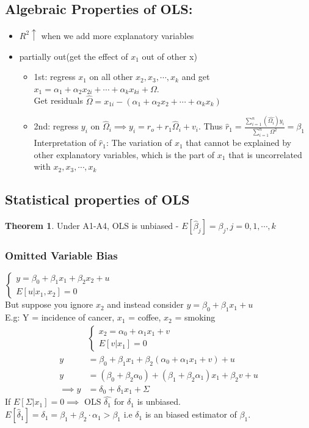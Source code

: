 \documentclass{article}
\theoremstyle{definition}
\theoremstyle{thrm}
\newtheorem{thrm}{Theorem}[section]
\theoremstyle{lma}
\theoremstyle{ppst}
\theoremstyle{crlr}
\begin{document}
\subsection{Algebraic Properties of OLS: }
\begin{itemize}
	\item $R^2\uparrow$ when we add more explanatory variables
	\item partially out(get the effect of $x_1$ out of other x)\begin{itemize}
		\item 1st: regress $x_1$ on all other $x_2, x_3,\cdots,x_k$ and get $x_1 = \alpha_1+\alpha_2x_{2i}+\cdots+\alpha_kx_{ki}+\Omega$.\\ Get residuals $\hat{\Omega} = x_{1i}-(\alpha_1+\alpha_2x_2+\cdots+\alpha_kx_k)$
		\item 2nd: regress $y_i$ on $\hat{\Omega}_i\implies y_i = r_o+r_1\hat{\Omega}_i+v_i$. Thus $\hat{r}_1 = \frac{\sum_{i=1}^n(\hat{\Omega_i})y_i}{\sum_{i=1}^n\Omega^2} = \hat{\beta_1}$\\Interpretation of $\hat{r}_1$: The variation of $x_1$ that cannot be explained by other explanatory variables, which is the part of $x_1$ that is uncorrelated with $x_2,x_3,\cdots,x_k$
	\end{itemize}
\end{itemize}

\subsection{Statistical properties of OLS}
\begin{thrm}
	Under A1-A4, OLS is unbiased - $E[\hat{\beta}_j] = \beta_j, j=0,1,\cdots,k$
\end{thrm}
\subsubsection{Omitted Variable Bias}
$\begin{cases}
	y = \beta_0+\beta_1x_1+\beta_2x_2+u\\
	E[u|x_1,x_2] = 0
\end{cases}$\\
But suppose you ignore $x_2$ and instead consider $y = \beta_0+\beta_1x_1+u$\\
E.g: Y = incidence of cancer, $x_1$ =  coffee,  $x_2$ = smoking
\begin{align*}
	&\begin{cases}
		x_2 = \alpha_0+\alpha_1x_1+v\\
		E[v|x_1]=0
	\end{cases}\\
	y &= \beta_0+\beta_1x_1+\beta_2(\alpha_0+\alpha_1x_1+v)+u\\
	y &= (\beta_0+\beta_2\alpha_0)+(\beta_1+\beta_2\alpha_1)x_1+\beta_2v+u\\
	\implies y&=\delta_0+\delta_1x_1+\Sigma
\end{align*}
If $E[\Sigma|x_1] = 0 \implies $ OLS $\hat{\delta_1}$ for $\delta_1$ is unbiased.\\
$E[\hat{\delta}_1] = \delta_1 = \beta_1+\beta_2\cdot \alpha_1 >\beta_1$ i.e $\delta_1$ is an biased estimator of $\beta_1$.
\end{document}
